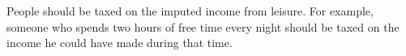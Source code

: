 People should be taxed on the imputed income from leisure.
For example, someone who spends two hours of free time every night should be taxed on the income he could have made during that time.